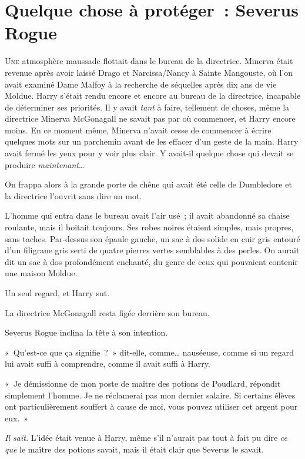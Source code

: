\chapter{Quelque chose à protéger~: Severus Rogue}

\lettrine{U}{ne} atmosphère maussade flottait dans le bureau de la directrice. Minerva était revenue après avoir laissé Drago et Narcissa/Nancy à Sainte Mangouste, où l'on avait examiné Dame Malfoy à la recherche de séquelles après dix ans de vie Moldue. Harry s'était rendu encore et encore au bureau de la directrice, incapable de déterminer ses priorités. Il y avait \emph{tant} à faire, tellement de choses, même la directrice Minerva McGonagall ne savait pas par où commencer, et Harry encore moins. En ce moment même, Minerva n'avait cesse de commencer à écrire quelques mots sur un parchemin avant de les effacer d'un geste de la main. Harry avait fermé les yeux pour y voir plus clair. Y avait-il quelque chose qui devait se produire \emph{maintenant}…

On frappa alors à la grande porte de chêne qui avait été celle de Dumbledore et la directrice l'ouvrit sans dire un mot.

L'homme qui entra dans le bureau avait l'air usé~; il avait abandonné sa chaise roulante, mais il boitait toujours. Ses robes noires étaient simples, mais propres, sans taches. Par-dessus son épaule gauche, un sac à dos solide en cuir gris entouré d'un filigrane gris serti de quatre pierres vertes semblables à des perles. On aurait dit un sac à dos profondément enchanté, du genre de ceux qui pouvaient contenir une maison Moldue.

Un seul regard, et Harry sut.

La directrice McGonagall resta figée derrière son bureau.

Severus Rogue inclina la tête à son intention.

«~Qu'est-ce que ça signifie~?~» dit-elle, comme… nauséeuse, comme si un regard lui avait suffi à comprendre, comme il avait suffi à Harry.

«~Je démissionne de mon poste de maître des potions de Poudlard, répondit simplement l'homme. Je ne réclamerai pas mon dernier salaire. Si certains élèves ont particulièrement souffert à cause de moi, vous pouvez utiliser cet argent pour eux.~»

\emph{Il sait.} L'idée était venue à Harry, même s'il n'aurait pas tout à fait pu dire \emph{ce que} le maître des potions savait, mais il était clair que Severus le savait.

